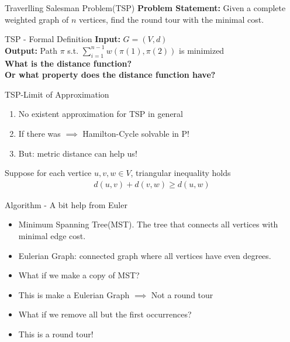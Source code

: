 \documentclass{beamer}
\begin{document}
\begin{frame}{Traverlling Salesman Problem(TSP)}
    \textbf{Problem Statement:} Given a complete weighted graph of $n$ vertices, find the round tour with the minimal cost. 
\end{frame}

\begin{frame}{TSP - Formal Definition}
    \textbf{Input:} $G = (V, d)$ \\
    \textbf{Output:} Path $\pi$ s.t. $\sum_{i = 1}^{n-1} w(\pi(1), \pi(2))$
    is minimized \\[20pt]
    \pause 
    \textbf{What is the distance function? \\ Or what property does the distance function have?}
\end{frame}

\begin{frame}{TSP-Limit of Approximation}
    \begin{enumerate}
        \item<1-3> No existent approximation for TSP in general 
        \item<2-3> If there was $\implies$ Hamilton-Cycle solvable in P!
        \item<3> But: metric distance can help us!
    \end{enumerate}
\end{frame}
\pause 
Suppose for each vertice $u, v, w \in V$, triangular inequality holds
\begin{align*}
    d(u, v) + d(v, w) \geq d(u, w)
\end{align*}

\begin{frame}{Algorithm - A bit help from Euler}
    \begin{itemize}
        \item<1-2> Minimum Spanning Tree(MST). The tree that connects all vertices with minimal edge cost.
        \item<2> Eulerian Graph: connected graph where all vertices have even degrees.
        \item<3-> What if we make a copy of MST?
        \item<4-> This is make a Eulerian Graph $\implies$ Not a round tour 
        \item<5-> What if we remove all but the first occurrences?
        \item<6-> This is a round tour!
    \end{itemize}
\end{frame}
\end{document}
